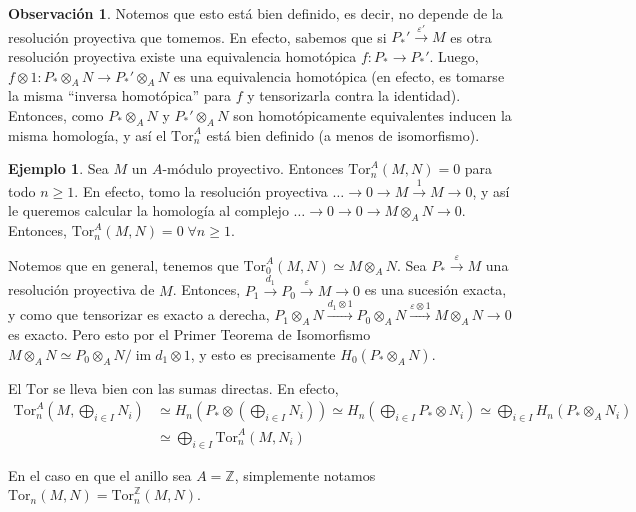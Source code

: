 \documentclass[12pt]{book}
\theoremstyle{definition}
\newtheorem{obs}[teo]{Observación}
\newtheorem{ex}[teo]{Ejemplo}
\newcommand{\ZZ}{\mathbb{Z}}      %
\DeclareMathOperator{\im}{im}
\begin{document}
\begin{obs}
Notemos que esto está bien definido, es decir, no depende de la resolución proyectiva que tomemos. En efecto, sabemos que si $P_*'\stackrel{\varepsilon'}{\longrightarrow} M$ es otra resolución proyectiva existe una equivalencia homotópica $f:P_*\to P_*'$. Luego, $f\otimes 1:P_*\otimes_A N\to P_*'\otimes_A N$ es una equivalencia homotópica (en efecto, es tomarse la misma "`inversa homotópica"' para $f$ y tensorizarla contra la identidad). Entonces, como $P_*\otimes_A N$ y $P_*'\otimes_A N$ son homotópicamente equivalentes inducen la misma homología, y así el $\mathrm{Tor}_n^A$ está bien definido (a menos de isomorfismo).
\end{obs}

\begin{ex}
Sea $M$ un $A$-módulo proyectivo. Entonces $\mathrm{Tor}_n^A(M,N)=0$ para todo $n\geq 1$. En efecto, tomo la resolución proyectiva $\ldots\longrightarrow 0\longrightarrow M\stackrel{1}{\longrightarrow} M \longrightarrow 0$, y así le queremos calcular la homología al complejo $\ldots\longrightarrow 0\longrightarrow 0\longrightarrow M\otimes_A N\longrightarrow 0$. Entonces, $\mathrm{Tor}_n^A(M,N)=0 \; \forall n\geq 1$.

Notemos que en general, tenemos que $\mathrm{Tor}_0^A(M,N)\simeq M\otimes_A N$. Sea $P_*\stackrel{\varepsilon}{\longrightarrow} M$ una resolución proyectiva de $M$. Entonces, $P_1\stackrel{d_1}{\longrightarrow} P_0\stackrel{\varepsilon}{\longrightarrow} M\longrightarrow 0$ es una sucesión exacta, y como que tensorizar es exacto a derecha, $P_1\otimes_A N\stackrel{d_1\otimes 1}{\longrightarrow} P_0\otimes_A N\stackrel{\varepsilon\otimes 1}{\longrightarrow} M\otimes_A N\longrightarrow 0$ es exacto. Pero esto por el Primer Teorema de Isomorfismo $M\otimes_A N\simeq P_0\otimes_A N/\im d_1\otimes 1$, y esto es precisamente $H_0(P_*\otimes_A N)$.

El $\mathrm{Tor}$ se lleva bien con las sumas directas. En efecto, \begin{align*}\mathrm{Tor}_n^A\left(M,\bigoplus_{i\in I}N_i\right)&\simeq H_n\left(P_*\otimes\left(\bigoplus_{i\in I}N_i\right)\right)\simeq H_n\left( \bigoplus_{i\in I}P_*\otimes N_i\right) \simeq \bigoplus_{i\in I}H_n(P_*\otimes_A N_i) \\ &\simeq \bigoplus_{i\in I}\mathrm{Tor}_n^A (M,N_i)\end{align*}

En el caso en que el anillo sea $A=\ZZ$, simplemente notamos $\mathrm{Tor}_n(M,N) = \mathrm{Tor}_n^\ZZ(M,N)$.
\end{ex}
\end{document}
